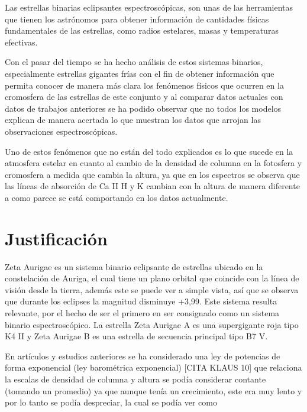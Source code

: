 \documentclass[11pt]{article}
\begin{document}
\noindent Las estrellas binarias eclipsantes espectroscópicas, son unas de las herramientas que tienen los astrónomos para obtener información de cantidades físicas fundamentales de las estrellas, como radios estelares, masas y temperaturas efectivas.

\noindent Con el pasar del tiempo se ha hecho análisis de estos sistemas binarios, especialmente estrellas gigantes frías con el fin de obtener información que permita conocer de manera más clara los fenómenos físicos que ocurren en la cromosfera de las estrellas de este conjunto y al comparar datos actuales con datos de trabajos anteriores se ha podido observar que no todos los modelos explican de manera acertada lo que muestran los datos que arrojan las observaciones espectroscópicas.

\noindent Uno de estos fenómenos que no están del todo explicados es lo que sucede en la atmosfera estelar en cuanto al cambio de la densidad de columna en la fotosfera y cromosfera a medida que cambia la altura, ya que en los espectros se observa que las líneas de absorción de Ca II H y K cambian con la altura de manera diferente a como parece se está comportando en los datos actualmente.


\section{Justificación}
Zeta Aurigae es un sistema binario eclipsante de estrellas ubicado en la constelación de Auriga, el cual tiene un plano orbital que coincide con la línea de visión desde la tierra, además este se puede ver a simple vista, así que se observa que durante los eclipses la magnitud disminuye +3,99. Este sistema resulta relevante, por el hecho de ser el primero en ser consignado como un sistema binario espectroscópico. La estrella Zeta Aurigae A es una supergigante roja tipo K4 II y Zeta Aurigae B es una estrella de secuencia principal tipo B7 V.
\vspace{3mm}

En artículos y estudios anteriores se ha considerado una ley de potencias de forma exponencial (ley barométrica exponencial) [CITA KLAUS 10] que relaciona la escalas de densidad de columna y  altura se podía considerar contante (tomando un promedio) ya que aunque tenía un crecimiento, este era muy lento y por lo tanto se podía despreciar, la cual se podía ver como
\end{document}
